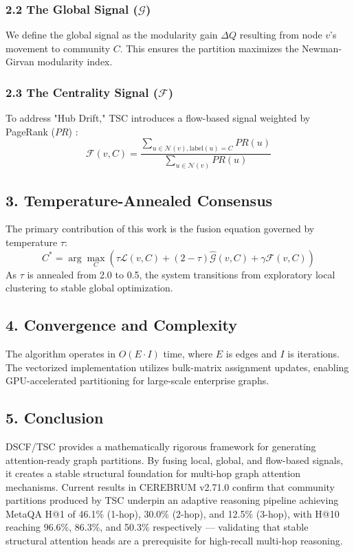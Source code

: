 \subsubsection*{2.2 The Global Signal ($\mathcal{G}$)}
We define the global signal as the modularity gain $\Delta Q$ resulting from node $v$'s movement to community $C$. This ensures the partition maximizes the Newman-Girvan modularity index.

\subsubsection*{2.3 The Centrality Signal ($\mathcal{F}$)}
To address "Hub Drift," TSC introduces a flow-based signal weighted by PageRank ($PR$) \cite{page1999pagerank}:
$$\mathcal{F}(v, C) = \frac{\sum_{u \in \mathcal{N}(v), \text{label}(u)=C} PR(u)}{\sum_{u \in \mathcal{N}(v)} PR(u)}$$

\subsection*{3. Temperature-Annealed Consensus}
The primary contribution of this work is the fusion equation governed by temperature $\tau$:
$$C^* = \arg\max_{C} ( \tau \mathcal{L}(v, C) + (2 - \tau) \widehat{\mathcal{G}}(v, C) + \gamma \mathcal{F}(v, C) )$$
As $\tau$ is annealed from 2.0 to 0.5, the system transitions from exploratory local clustering to stable global optimization.

\subsection*{4. Convergence and Complexity}
The algorithm operates in $O(E \cdot I)$ time, where $E$ is edges and $I$ is iterations. The vectorized implementation utilizes bulk-matrix assignment updates, enabling GPU-accelerated partitioning for large-scale enterprise graphs.

\subsection*{5. Conclusion}
DSCF/TSC provides a mathematically rigorous framework for generating attention-ready graph partitions. By fusing local, global, and flow-based signals, it creates a stable structural foundation for multi-hop graph attention mechanisms. Current results in CEREBRUM v2.71.0 confirm that community partitions produced by TSC underpin an adaptive reasoning pipeline achieving MetaQA H@1 of 46.1\% (1-hop), 30.0\% (2-hop), and 12.5\% (3-hop), with H@10 reaching 96.6\%, 86.3\%, and 50.3\% respectively --- validating that stable structural attention heads are a prerequisite for high-recall multi-hop reasoning.

